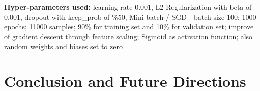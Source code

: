 \documentclass{llncs}       %
\begin{document}
\textbf{Hyper-parameters used: }learning rate 0.001, L2 Regularization with beta of 0.001, dropout with keep\_prob of \%50, Mini-batch / SGD 
- batch size 100; 1000 epochs; 11000 samples; 90\% for training set and 
10\% for validation set; improve of gradient descent through feature 
scaling; Sigmoid as activation function; also random weights and biases 
set to zero

 

\paragraph{}\paragraph{}
\paragraph{}\paragraph{}
\paragraph{}\paragraph{}
\paragraph{}\paragraph{}
\paragraph{}\paragraph{}
\paragraph{}\paragraph{}

\section{Conclusion and Future Directions}
\label{sec:4}
\end{document}
